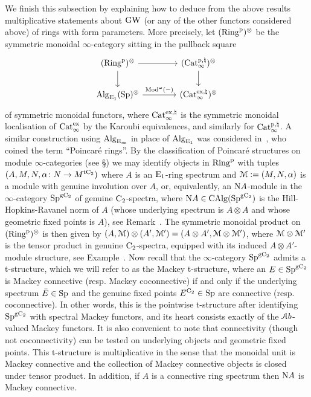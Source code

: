 We finish this subsection by explaining how to deduce from the above results multiplicative statements about $\operatorname{GW}$ (or any of the other functors considered above) of rings with form parameters. More precisely, let $(\mathrm{Ring}^{\mathrm{p}})^{\otimes}$ be the symmetric monoidal $\infty$-category sitting in the pullback square
\[
\begin{tikzcd}[column sep=40pt]
(\Ringp)^{\otimes}\ar[r]\ar[d] & (\Catpi)^{\otimes}\ar[d] \\
\Alg_{\Eone}(\Sp)^{\otimes} \ar[r,"\Modp{-}"] & (\Catxi)^{\otimes}
\end{tikzcd}
\]
of symmetric monoidal functors, where $\mathrm{Cat}^{\mathrm{ex},\natural}_{\infty}$ is the symmetric monoidal localisation of $\mathrm{Cat}_\infty^{\mathrm{ex}}$ by the Karoubi equivalences, and similarly for $\mathrm{Cat}^{\mathrm p,\natural}_{\infty}$. A similar construction using $\mathrm{Alg}_{{\mathrm{E}_{\infty}}}$ in place of $\mathrm{Alg}_{{\mathrm{E}_{1}}}$ was considered in~\cite{poincare-rings}, who coined the term ``Poincaré rings''.
By the classification of Poincaré structures on module $\infty$-categories (see \S{}) we may identify objects in $\mathrm{Ring}^{\mathrm{p}}$ with tuples $(A,M,N,\alpha\colon N \to M^{{\mathrm{t}\mathrm{C_2}}})$ where $A$ is an ${\mathrm{E}_{1}}$-ring spectrum and $\mathcal{M} := (M,N,\alpha)$ is a module with genuine involution over $A$, or, equivalently, an $\mathrm{N} A$-module in the $\infty$-category $\mathrm{Sp}^{{\mathrm{g}\mathrm{C_2}}}$ of genuine $\mathrm{C_2}$-spectra, where $\mathrm{N} A \in \mathrm{CAlg}(\mathrm{Sp}^{\mathrm{g}\mathrm{C_2}})$ is the Hill-Hopkins-Ravanel norm of $A$ (whose underlying spectrum is $A \otimes A$ and whose geometric fixed points is $A$), see Remark~. %
The symmetric monoidal product on $(\mathrm{Ring}^{\mathrm{p}})^{\otimes}$ is then given by $(A,\mathcal{M}) \otimes (A',\mathcal{M}') = (A \otimes A',\mathcal{M} \otimes \mathcal{M}')$, where $\mathcal{M} \otimes \mathcal{M}'$ is the tensor product in genuine $\mathrm{C_2}$-spectra, equipped with its induced $A \otimes A'$-module structure, see Example~. Now recall that the $\infty$-category $\mathrm{Sp}^{{\mathrm{g}\mathrm{C_2}}}$ admits a t-structure, which we will refer to as the Mackey t-structure, where an $E \in \mathrm{Sp}^{{\mathrm{g}\mathrm{C_2}}}$ is Mackey connective (resp. Mackey coconnective) if and only if the underlying spectrum $\bar{E} \in \mathrm{Sp}$ and the genuine fixed points $E^{\mathrm{C_2}} \in \mathrm{Sp}$ are connective (resp. coconnective). In other words, this is the pointwise t-structure after identifying $\mathrm{Sp}^{{\mathrm{g}\mathrm{C_2}}}$ with spectral Mackey functors, and its heart consists exactly of the $\mathcal{A}b$-valued Mackey functors. It is also convenient to note that connectivity (though not coconnectivity) can be tested on underlying objects and geometric fixed points. This t-structure is multiplicative in the sense that the monoidal unit is Mackey connective and the collection of Mackey connective objects is closed under tensor product. In addition, if $A$ is a connective ring spectrum then $\mathrm{N} A$ is Mackey connective.
